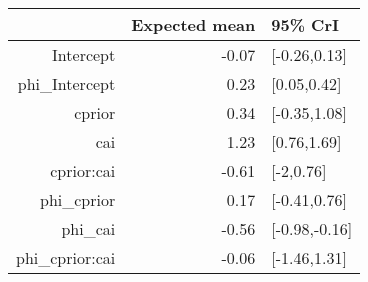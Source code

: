 \begin{tabular}{rrl}
  \hline
 & Expected mean & 95\% CrI \\ 
  \hline
Intercept & -0.07 & [-0.26,0.13] \\ 
  phi\_Intercept & 0.23 & [0.05,0.42] \\ 
  cprior & 0.34 & [-0.35,1.08] \\ 
  cai & 1.23 & [0.76,1.69] \\ 
  cprior:cai & -0.61 & [-2,0.76] \\ 
  phi\_cprior & 0.17 & [-0.41,0.76] \\ 
  phi\_cai & -0.56 & [-0.98,-0.16] \\ 
  phi\_cprior:cai & -0.06 & [-1.46,1.31] \\ 
   \hline
\end{tabular}

